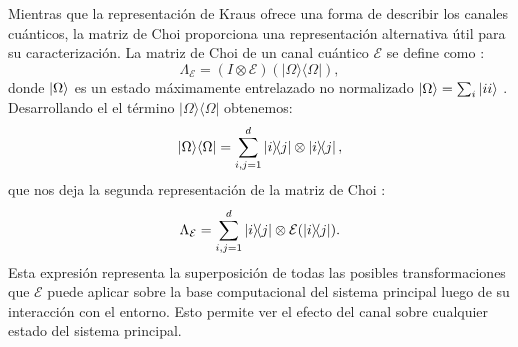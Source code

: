 \documentclass[letterpaper,12pt]{thesisECFM}
\theoremstyle{plain}
\theoremstyle{definition}
\theoremstyle{definition}
\theoremstyle{remark}
\newcommand{\1}{\mathbb{1}}
\begin{document}
Mientras que la representación de Kraus ofrece una forma de describir los canales cuánticos, la matriz de Choi proporciona una representación alternativa útil para su caracterización. 
La matriz de Choi de un canal cuántico $\mathcal{E}$ se define como \cite{QProcess}:
\begin{equation} 
\Lambda_{\mathcal{E}} = (I \otimes \mathcal{E})(|\Omega\rangle\langle\Omega|),
\end{equation} 
donde $\ket{\Omega}$ es un estado máximamente entrelazado no normalizado $\ket{\Omega} = \sum_i \ket{ii}$ .
Desarrollando el el término $|\Omega\rangle\langle\Omega|$ obtenemos:
\begin{equation}
|\Omega\rangle\langle\Omega| = \sum_{i,j=1}^{d} \ketbra{i}{j} \otimes \ketbra{i}{j},
\end{equation} 
que nos deja la segunda representación de la matriz de Choi
\cite{Qiskit_documentation,QProcess}:
\begin{equation}\label{ec:Choi_ketbra}
\Lambda_{\mathcal{E}} = \sum_{i,j=1}^{d} \ketbra{i}{j} \otimes \mathcal{E}(\ketbra{i}{j}).
\end{equation}
Esta expresión representa la superposición de todas las posibles transformaciones que $\mathcal{E}$ puede aplicar sobre la base computacional del sistema principal luego de su interacción con el entorno. Esto permite ver el efecto del canal sobre cualquier estado del sistema principal.
\end{document}
